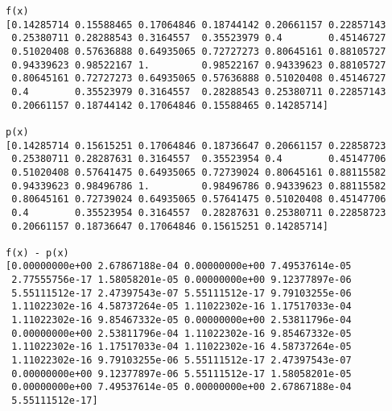 \documentclass[11pt]{article}
\makeatletter
\newcommand{\boxspacing}{\kern\kvtcb@left@rule\kern\kvtcb@boxsep}
\newcommand{\prompt}[4]{
        \ttfamily\llap{{\color{#2}[#3]:\hspace{3pt}#4}}\vspace{-\baselineskip}
    }
\makeatother
\begin{document}
    \begin{Verbatim}[commandchars=\\\{\}]
f(x)
[0.14285714 0.15588465 0.17064846 0.18744142 0.20661157 0.22857143
 0.25380711 0.28288543 0.3164557  0.35523979 0.4        0.45146727
 0.51020408 0.57636888 0.64935065 0.72727273 0.80645161 0.88105727
 0.94339623 0.98522167 1.         0.98522167 0.94339623 0.88105727
 0.80645161 0.72727273 0.64935065 0.57636888 0.51020408 0.45146727
 0.4        0.35523979 0.3164557  0.28288543 0.25380711 0.22857143
 0.20661157 0.18744142 0.17064846 0.15588465 0.14285714]

p(x)
[0.14285714 0.15615251 0.17064846 0.18736647 0.20661157 0.22858723
 0.25380711 0.28287631 0.3164557  0.35523954 0.4        0.45147706
 0.51020408 0.57641475 0.64935065 0.72739024 0.80645161 0.88115582
 0.94339623 0.98496786 1.         0.98496786 0.94339623 0.88115582
 0.80645161 0.72739024 0.64935065 0.57641475 0.51020408 0.45147706
 0.4        0.35523954 0.3164557  0.28287631 0.25380711 0.22858723
 0.20661157 0.18736647 0.17064846 0.15615251 0.14285714]

f(x) - p(x)
[0.00000000e+00 2.67867188e-04 0.00000000e+00 7.49537614e-05
 2.77555756e-17 1.58058201e-05 0.00000000e+00 9.12377897e-06
 5.55111512e-17 2.47397543e-07 5.55111512e-17 9.79103255e-06
 1.11022302e-16 4.58737264e-05 1.11022302e-16 1.17517033e-04
 1.11022302e-16 9.85467332e-05 0.00000000e+00 2.53811796e-04
 0.00000000e+00 2.53811796e-04 1.11022302e-16 9.85467332e-05
 1.11022302e-16 1.17517033e-04 1.11022302e-16 4.58737264e-05
 1.11022302e-16 9.79103255e-06 5.55111512e-17 2.47397543e-07
 0.00000000e+00 9.12377897e-06 5.55111512e-17 1.58058201e-05
 0.00000000e+00 7.49537614e-05 0.00000000e+00 2.67867188e-04
 5.55111512e-17]
    \end{Verbatim}

    \begin{tcolorbox}[breakable, size=fbox, boxrule=1pt, pad at break*=1mm,colback=cellbackground, colframe=cellborder]
\prompt{In}{incolor}{ }{\boxspacing}
\begin{Verbatim}[commandchars=\\\{\}]

\end{Verbatim}
\end{tcolorbox}


    
    
    
\end{document}
